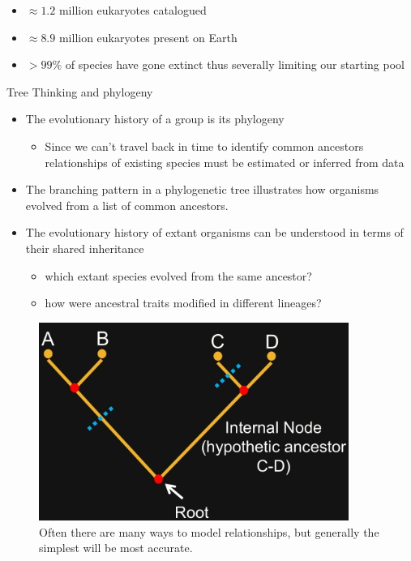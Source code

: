 \documentclass[]{article}
\begin{document}
\begin{itemize}
	\item $\approx 1.2$ million eukaryotes catalogued
	\item $\approx 8.9$ million eukaryotes present on Earth
	\item $>99\%$ of species have gone extinct thus severally limiting our starting pool
\end{itemize}

Tree Thinking and phylogeny
\begin{itemize}
	\item The evolutionary history of a group is its phylogeny
	\begin{itemize}
		\item Since we can’t travel back in time to identify
		common ancestors relationships of existing
		species must be estimated or inferred from data
	\end{itemize}
	\item The branching pattern in a phylogenetic tree illustrates how organisms evolved from a list of common ancestors.
	\item The evolutionary history of extant organisms can
	be understood in terms of their shared inheritance
	\begin{itemize}
		\item which extant species evolved from the same ancestor?
		\item how were ancestral traits modified in different lineages?
	\end{itemize}
\end{itemize}

\begin{figure}[H]
	\caption{Often there are many ways to model relationships, but generally the simplest will be most accurate.}\label{PhylogenicTree}
	\includegraphics[width=0.9\textwidth]{PhylogenicTree}
\end{figure}
\end{document}

